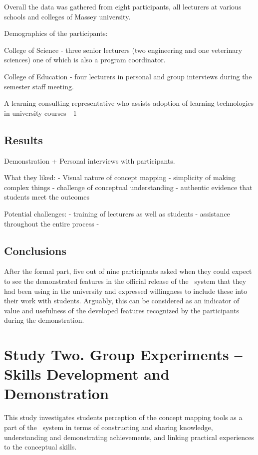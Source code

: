 Overall the data was gathered from eight participants, all lecturers at
various schools and colleges of Massey university.

Demographics of the participants:

College of Science - three senior lecturers (two engineering and one veterinary
sciences) one of which is also a program coordinator.

College of Education - four lecturers in personal and group interviews during
the semester staff meeting.

A learning consulting representative who assists adoption of learning
technologies in university courses - 1

\subsection{Results}

Demonstration + Personal interviews with participants.

What they liked:
- Visual nature of concept mapping
- simplicity of making complex things
- challenge of conceptual understanding
- authentic evidence that students meet the outcomes

Potential challenges:
- training of lecturers as well as students 
- assistance throughout the entire process
- 

\subsection{Conclusions}

After the formal part, five out of nine participants asked when they could
expect to see the demonstrated features in the official release of the
\ep~system that they had been using in the university and expressed willingness
to include these into their work with students. Arguably, this can be considered
as an indicator of value and usefulness of the developed features recognized by
the participants during the demonstration.

\section{Study Two. Group Experiments -- \LLLc Skills Development and
Demonstration}
\label{sec:two}

This study investigates students perception of the concept mapping tools as a
part of the \ep~system in terms of constructing and sharing knowledge,
understanding and demonstrating achievements, and linking practical experiences
to the conceptual skills.

